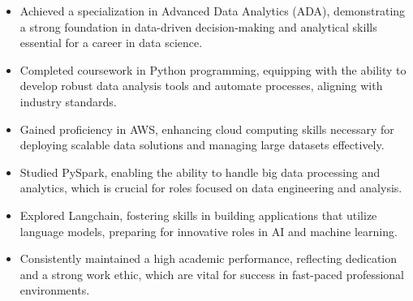 \documentclass[10pt,a4paper,ragged2e,withhyper]{imports/altacv}
\begin{document}
\begin{paracol}{2}
\medskip


\begin{itemize}
\item Achieved a specialization in Advanced Data Analytics (ADA), demonstrating a strong foundation in data-driven decision-making and analytical skills essential for a career in data science.
\item Completed coursework in Python programming, equipping with the ability to develop robust data analysis tools and automate processes, aligning with industry standards.
\item Gained proficiency in AWS, enhancing cloud computing skills necessary for deploying scalable data solutions and managing large datasets effectively.
\item Studied PySpark, enabling the ability to handle big data processing and analytics, which is crucial for roles focused on data engineering and analysis.
\item Explored Langchain, fostering skills in building applications that utilize language models, preparing for innovative roles in AI and machine learning.
\item Consistently maintained a high academic performance, reflecting dedication and a strong work ethic, which are vital for success in fast-paced professional environments.
\end{itemize}

\medskip

\end{paracol}
\end{document}

